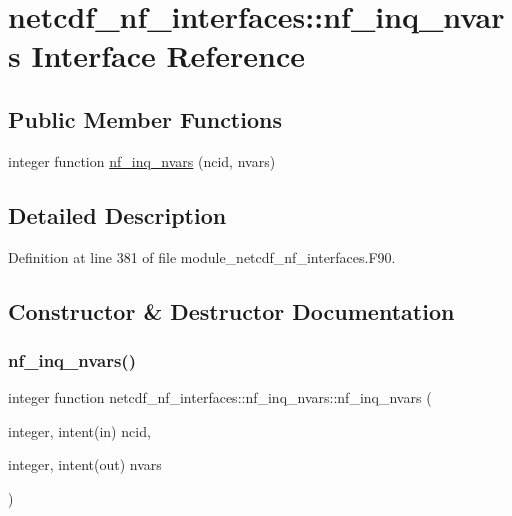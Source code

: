 \hypertarget{interfacenetcdf__nf__interfaces_1_1nf__inq__nvars}{}\section{netcdf\+\_\+nf\+\_\+interfaces\+:\+:nf\+\_\+inq\+\_\+nvars Interface Reference}
\label{interfacenetcdf__nf__interfaces_1_1nf__inq__nvars}
\subsection*{Public Member Functions}
\begin{DoxyCompactItemize}
\item 
integer function \hyperlink{interfacenetcdf__nf__interfaces_1_1nf__inq__nvars_ac6b6bed0ac48c5a8da58de94547f1967}{nf\+\_\+inq\+\_\+nvars} (ncid, nvars)
\end{DoxyCompactItemize}


\subsection{Detailed Description}


Definition at line 381 of file module\+\_\+netcdf\+\_\+nf\+\_\+interfaces.\+F90.



\subsection{Constructor \& Destructor Documentation}
\mbox{\label{interfacenetcdf__nf__interfaces_1_1nf__inq__nvars_ac6b6bed0ac48c5a8da58de94547f1967}} 
\subsubsection{\texorpdfstring{nf\+\_\+inq\+\_\+nvars()}{nf\_inq\_nvars()}}
{\footnotesize\ttfamily integer function netcdf\+\_\+nf\+\_\+interfaces\+::nf\+\_\+inq\+\_\+nvars\+::nf\+\_\+inq\+\_\+nvars (\begin{DoxyParamCaption}\item[{integer, intent(in)}]{ncid,  }\item[{integer, intent(out)}]{nvars }\end{DoxyParamCaption})}



